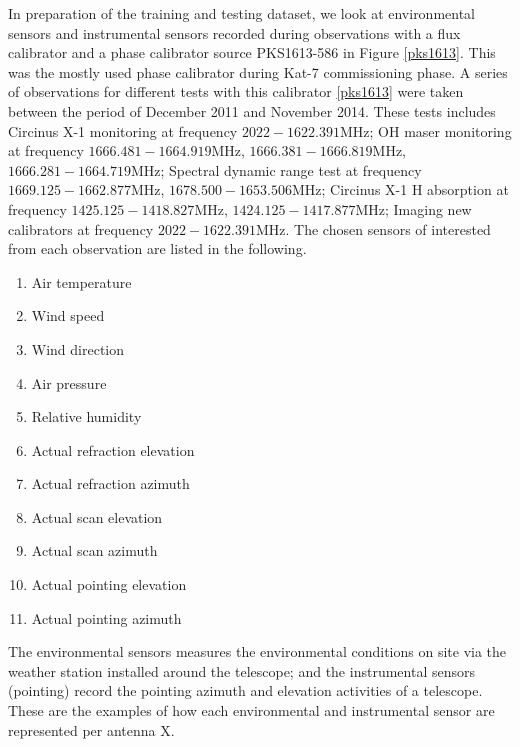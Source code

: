 In preparation of the training and testing dataset, we look at environmental sensors and instrumental sensors
recorded during observations with a flux calibrator and a phase calibrator source
PKS1613-586 in Figure \ref{pks1613}. This was the mostly used phase calibrator during Kat-7 commissioning phase. A series of observations for different tests with this calibrator \ref{pks1613} were taken between the period of December 2011 and November 2014. These tests includes Circinus X-1 monitoring at frequency $2022 - 1622.391 \text{MHz}$; OH maser monitoring at frequency $1666.481 - 1664.919 \text{MHz}$, $1666.381-1666.819\text{MHz}$,  $1666.281- 1664.719\text{MHz}$; Spectral dynamic range test at frequency $1669.125 - 1662.877 \text{MHz}$, $1678.500 - 1653.506 \text{MHz}$; Circinus X-1 H absorption at frequency $1425.125 - 1418.827 \text{MHz}$, $1424.125 - 1417.877 \text{MHz}$; Imaging new calibrators at frequency $2022 - 1622.391 \text{MHz}$. The chosen sensors of interested from each observation are listed in the following. 
\begin{enumerate}

\item Air temperature
\item Wind speed
\item Wind direction 
\item Air pressure 
\item Relative humidity 
\item Actual refraction elevation
\item Actual refraction azimuth
\item Actual scan elevation
\item Actual scan azimuth 
\item Actual pointing elevation
\item Actual pointing azimuth 
\end{enumerate}
The environmental sensors measures the environmental conditions on site via the weather station installed around the telescope; and the instrumental sensors (pointing) record the pointing azimuth and elevation activities of a telescope. These are the examples of how each environmental and instrumental sensor are represented per antenna X.

 
